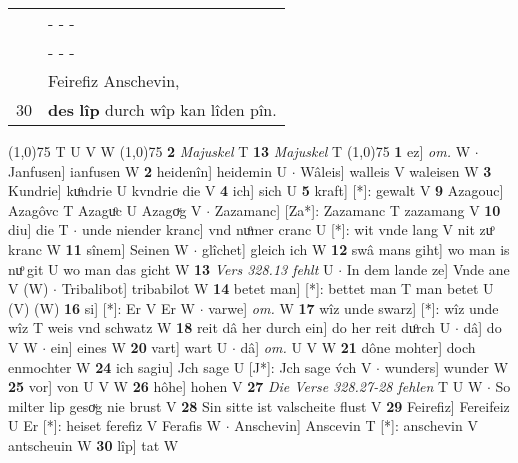 \documentclass[8pt,a4paper,notitlepage]{article}
\begin{document}
\begin{table}[ht]
\begin{minipage}[t]{0.5\linewidth}
\begin{tabular}{rl}
 & \multicolumn{1}{l}{ - - - }\\ 
 & \multicolumn{1}{l}{ - - - }\\ 
 & Feirefiz Anschevin,\\ 
30 & \textbf{des} \textbf{lîp} durch wîp kan lîden pîn.\\ 
\end{tabular}
\scriptsize
\line(1,0){75} \newline
T U V W \newline
\line(1,0){75} \newline
\textbf{2} \textit{Majuskel} T  \textbf{13} \textit{Majuskel} T  \newline
\line(1,0){75} \newline
\textbf{1} ez] \textit{om.} W  $\cdot$ Janfusen] ianfusen W \textbf{2} heidenîn] heidemin U  $\cdot$ Wâleis] walleis V waleisen W \textbf{3} Kundrie] kuͦndrie U kvndrie die V \textbf{4} ich] sich U \textbf{5} kraft] [*]: gewalt V \textbf{9} Azagouc] Azagôvc T Azaguͦc U Azagoͮg V  $\cdot$ Zazamanc] [Za*]: Zazamanc T zazamang V \textbf{10} diu] die T  $\cdot$ unde niender kranc] vnd nuͦmer cranc U [*]: wit vnde lang V nit zuͦ kranc W \textbf{11} sînem] Seinen W  $\cdot$ glîchet] gleich ich W \textbf{12} swâ mans giht] wo man is nuͦ git U wo man das gicht W \textbf{13} \textit{Vers 328.13 fehlt} U   $\cdot$ In dem lande ze] Vnde ane V (W)  $\cdot$ Tribalibot] tribabilot W \textbf{14} betet man] [*]: bettet man T man betet U (V) (W) \textbf{16} si] [*]: Er V Er W  $\cdot$ varwe] \textit{om.} W \textbf{17} wîz unde swarz] [*]: wîz unde wîz T weis vnd schwatz W \textbf{18} reit dâ her durch ein] do her reit duͦrch U  $\cdot$ dâ] do V W  $\cdot$ ein] eines W \textbf{20} vart] wart U  $\cdot$ dâ] \textit{om.} U V W \textbf{21} dône mohter] doch enmochter W \textbf{24} ich sagiu] Jch sage U [J*]: Jch sage v́ch V  $\cdot$ wunders] wunder W \textbf{25} vor] von U V W \textbf{26} hôhe] hohen V \textbf{27} \textit{Die Verse 328.27-28 fehlen} T U W   $\cdot$ So milter lip gesoͮg nie brust V \textbf{28} Sin sitte ist valscheite flust V \textbf{29} Feirefiz] Fereifeiz U Er [*]: heiset ferefiz V Ferafis W  $\cdot$ Anschevin] Anscevin T [*]: anschevin V antscheuin W \textbf{30} lîp] tat W \newline
\end{minipage}
\end{table}
\end{document}
